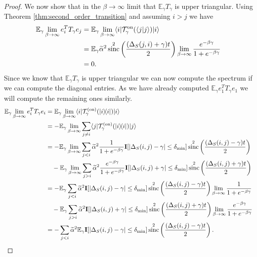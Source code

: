 \documentclass{article}
\newcommand{\on}{\rm on}
\newcommand{\ket}[1]{|#1\rangle}
\newcommand{\bra}[1]{\langle #1|}
\newcommand{\braket}[2]{\langle #1|#2\rangle}
\newcommand{\ketbra}[2]{| #1\rangle\! \langle #2|}
\newcommand{\EE}{\mathbb{E}}
\newcommand{\TT}{\mathcal{T}}
\DeclareMathOperator{\sinc}{sinc}
\begin{document}
\begin{proof}
We now show that in the $\beta \to \infty$ limit that $\EE_\gamma T_\gamma$ is upper triangular. Using Theorem \ref{thm:second_order_transition} and assuming $i > j$ we have
\begin{align}
    \EE_\gamma \lim_{\beta \to \infty} e_i^T T_\gamma e_j &= \EE_\gamma \lim_{\beta \to \infty} \bra{i} \TT_\gamma^{\on}(\braket{j}{j})\ket{i} \\
    &= \EE_\gamma \widetilde{\alpha}^2 \sinc^2 \left(\frac{(\Delta_S(j, i) + \gamma)t}{2} \right) \lim_{\beta \to \infty} \frac{e^{-\beta \gamma}}{1 + e^{-\beta \gamma}} \\
    &= 0.
 \end{align}
Since we know that $\EE_\gamma T_\gamma$ is upper triangular we can now compute the spectrum if we can compute the diagonal entries. As we have already computed $\EE_\gamma e_1^T T_\gamma e_1$ we will compute the remaining ones similarly. 
\begin{align}
    \EE_\gamma \lim_{\beta \to \infty} e_i^T T_\gamma e_i &= \EE_\gamma \lim_{\beta \to \infty} \bra{i} \TT_\gamma^{(\on)}(\ketbra{i}{i}) \ket{i} \\
    &= - \EE_\gamma \lim_{\beta \to \infty} \sum_{j \neq i} \bra{j} \TT_\gamma^{(\on)}(\ketbra{i}{i}) \ket{j} \\
    &= - \EE_\gamma \lim_{\beta \to \infty} \sum_{j < i} \widetilde{\alpha}^2 \frac{1}{1 + e^{-\beta \gamma}} \mathbf{I}[|\Delta_S(i,j) - \gamma| \le \delta_{\min}] \sinc^2 \left( \frac{(\Delta_S(i, j) - \gamma) t}{2} \right) \nonumber \\
    &\quad - \EE_\gamma \lim_{\beta \to \infty} \sum_{j > i} \widetilde{\alpha}^2 \frac{e^{-\beta \gamma}}{1 + e^{-\beta \gamma}} \mathbf{I}[|\Delta_S(i, j) + \gamma| \le \delta_{\min}] \sinc^2 \left( \frac{(\Delta_S(i, j) + \gamma) t}{2} \right) \\
    &= - \EE_\gamma  \sum_{j < i} \widetilde{\alpha}^2  \mathbf{I}[|\Delta_S(i,j) - \gamma| \le \delta_{\min}] \sinc^2 \left( \frac{(\Delta_S(i, j) - \gamma) t}{2} \right) \lim_{\beta \to \infty} \frac{1}{1 + e^{-\beta \gamma}} \nonumber \\
    &\quad - \EE_\gamma \sum_{j > i} \widetilde{\alpha}^2 \mathbf{I}[|\Delta_S(i, j) + \gamma| \le \delta_{\min}] \sinc^2 \left( \frac{(\Delta_S(i, j) + \gamma) t}{2} \right) \lim_{\beta \to \infty} \frac{e^{-\beta \gamma}}{1 + e^{-\beta \gamma}} \\
    &= -   \sum_{j < i} \widetilde{\alpha}^2 \EE_\gamma \mathbf{I}[|\Delta_S(i,j) - \gamma| \le \delta_{\min}] \sinc^2 \left( \frac{(\Delta_S(i, j) - \gamma) t}{2} \right). \label{eq:ground_state_tmp_1}
\end{align}


\end{proof}
\end{document}
